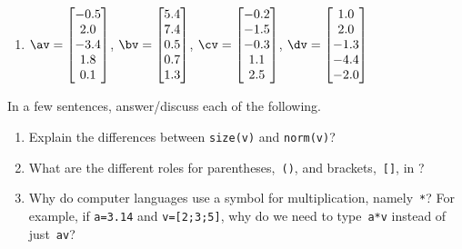 \begin{exercise}
\begin{enumerate}
\item \(\av=\begin{bmatrix}-0.5\\2.0\\-3.4\\1.8\\0.1\end{bmatrix}\), \(\bv=\begin{bmatrix}5.4\\7.4\\0.5\\0.7\\1.3\end{bmatrix}\), \(\cv=\begin{bmatrix} -0.2\\-1.5\\-0.3\\1.1\\2.5\end{bmatrix}\), \(\dv=\begin{bmatrix}1.0\\2.0\\-1.3\\-4.4\\-2.0\end{bmatrix}\)
\setbox\ajrqrbox\hbox{}%
\marginajrbox%

\end{enumerate}
\end{exercise}





\begin{exercise}  
In a few sentences, answer\slash discuss each of the following.
\begin{enumerate}
\item Explain the differences between \verb|size(v)| and \verb|norm(v)|?

\item What are the different roles for parentheses,~\verb|()|, and brackets,~\verb|[]|, in \script?

\item Why do computer languages use a symbol for multiplication, namely~\verb|*|?  For example, if \verb|a=3.14| and \verb|v=[2;3;5]|, why do we need to type~\verb|a*v| instead of just~\verb|av|?

\end{enumerate}
\end{exercise}

\begin{comment}%
why, what caused X?
how did X occur?
what-if? what-if-not?
how does X compare with Y?
what is the evidence for X?
why is X important?
\end{comment}


